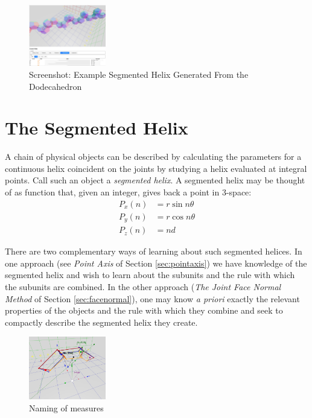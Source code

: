 \documentclass{svproc}
\begin{document}
\begin{figure}
     \centering
     \includegraphics[width=0.30\textwidth]{figures/Dodecahedral.png}
     \caption{Screenshot: Example Segmented Helix Generated From the Dodecahedron}
  \label{fig:dodecahedron}
\end{figure}

\section{The Segmented Helix}

A chain of physical objects can be described by
calculating
the parameters for a continuous helix coincident on the joints by studying
a helix evaluated at integral points. Call such an object a {\em segmented helix}.
A segmented helix may be thought of as function that, given an integer, gives back a point in
3-space:
\begin{align}
    P_x(n) &= r \sin{n \theta}  \\
    P_y(n) &= r \cos{n \theta} \\
   P_z(n) &= n d
\end{align}

There are two complementary ways of learning about such segmented helices.
In one approach (see {\em Point Axis} of Section \ref{sec:pointaxis})
we have knowledge of the segmented helix and
wish to learn about the subunits and the rule with which the subunits are combined.
In the other approach ({\em The Joint Face Normal Method} of Section \ref{sec:facenormal}),
one may know {\it a priori} exactly the
relevant properties of the objects and the rule with which they combine
and seek to compactly describe the segmented helix they create.


\begin{figure}
     \centering
     \includegraphics[width=0.30\textwidth]{figures/ABCDFigure.png}
     \caption{Naming of measures}
  \label{fig:naming}
\end{figure}
\end{document}

